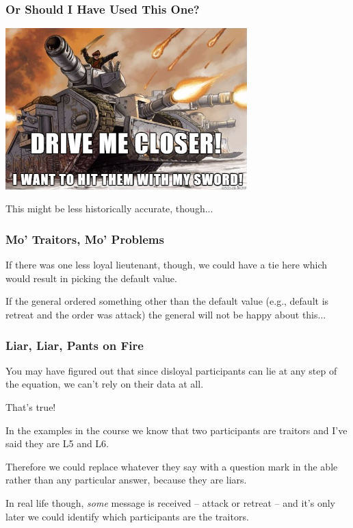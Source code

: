 \begin{frame}
\frametitle{Or Should I Have Used This One?}

\begin{center}
	\includegraphics[width=0.7\textwidth]{images/warhammer.png}
\end{center}

This might be less historically accurate, though...

\end{frame}


\begin{frame}
\frametitle{Mo' Traitors, Mo' Problems}

If there was one less loyal lieutenant, though, we could have a tie here which would result in picking the default value. 

If the general ordered something other than the default value (e.g., default is retreat and the order was attack) the general will not be happy about this...

\end{frame}

\begin{frame}
\frametitle{Liar, Liar, Pants on Fire}

You may have figured out that since disloyal participants can lie at any step of the equation, we can't rely on their data at all. 

That's true! 

In the examples in the course we know that two participants are traitors and I've said they are L5 and L6. 

Therefore we could replace whatever they say with a question mark in the able rather than any particular answer, because they are liars.

 In real life though, \textit{some} message is received -- attack or retreat -- and it's only later we could identify which participants are the traitors.
\end{frame}


